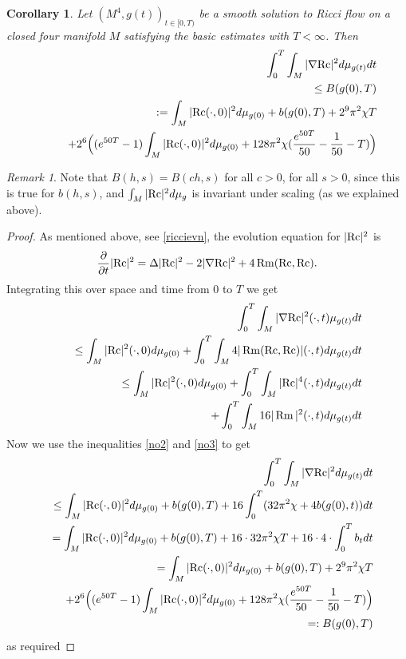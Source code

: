 \documentclass{amsart}
\numberwithin{equation}{section}
\newtheorem{coro}[theo]{Corollary}
\theoremstyle{definition}
\theoremstyle{remark}
\newtheorem{remark}[theo]{Remark}
\begin{document}
\begin{coro}\label{gradientestimate}
Let $(M^4,g(t))_{t \in [0,T)}$ be a  smooth solution to Ricci
flow on a closed four manifold $M$ satisfying the basic estimates with
$T< \infty$.
Then \begin{eqnarray}
 && \int_{0}^T \int_M |{\nabla} {{\rm{Rc}}}|^2 d \mu_{g(t)} dt \cr
&& \ \ \ \leq B(g(0),T)\cr
&& \ \ \ := 
\int_M |{{\rm{Rc}}}(\cdot,0)|^2  d \mu_{g(0)}  +b(g(0),T) +2^9
\pi^2\chi T \cr
&& \ \ \ \ \ + 2^6\Big( 
 (e^{50T}-1) \int_M |{{\rm{Rc}}}(\cdot,0)|^2  d
\mu_{g(0)}   + 128 \pi^2 \chi( \frac{e^{50T}}{50} - \frac{1}{50} - T)\Big)
\label{gradienteq}
\end{eqnarray}
\end{coro}
\begin{remark}
Note that $B(h,s) = B(ch,s)$ for all $c>0$, for all $s>0$, since this
is true for $b(h,s)$, and $\int_M |{{\rm{Rc}}}|^2 d\mu_g$ is invariant
under scaling (as we explained above).
\end{remark}
\begin{proof}
As mentioned above, see \eqref{riccievn},
the evolution equation for $|{{\rm{Rc}}}|^2$ is 
$${\frac{\partial }{\partial t} } |{{\rm{Rc}}}|^2 = {\Delta} |{{\rm{Rc}}}|^2 - 2 | {\nabla} {{\rm{Rc}}}|^2 + 4\operatorname{Rm}({{\rm{Rc}}},{{\rm{Rc}}}).$$
Integrating this over space  and time from $0$ to $T$  we get
\begin{eqnarray} 
&& \int_{0}^T \int_M |{\nabla} {{\rm{Rc}}}|^2( \cdot,t) \mu_{g(t)} dt \cr
&& \ \ \  \leq \int_M |{{\rm{Rc}}}|^2(\cdot,0)  d \mu_{g(0)}  + \int_0^T \int_M 4 |\operatorname{Rm}({{\rm{Rc}}},{{\rm{Rc}}}) |(\cdot,t)d \mu_{g(t)} dt \cr
&& \ \ \ \leq \int_M |{{\rm{Rc}}}|^2(\cdot,0) d \mu_{g(0)}  + \int_0^T \int_M |{{\rm{Rc}}}|^4(\cdot,t) d
\mu_{g(t)} dt  \cr
&& \ \ \ \ \
+ \int_0^T \int_M 16 |\operatorname{Rm}|^2(\cdot,t) d \mu_{g(t)} dt 
\end{eqnarray}
Now we use the  inequalities  \eqref{no2} and \eqref{no3} to get
\begin{eqnarray} 
&& \int_{0}^T \int_M |{\nabla} {{\rm{Rc}}}|^2 d \mu_{g(t)} dt \cr
&& \leq  \int_M |{{\rm{Rc}}}(\cdot,0)|^2  d \mu_{g(0)} + b(g(0),T) + 16 \int_0^T( 32
\pi^2 \chi +4 b(g(0),t)) dt\cr
&& = \int_M |{{\rm{Rc}}}(\cdot,0)|^2  d \mu_{g(0)}  +b(g(0),T) +16 \cdot 32
\pi^2\chi T + 16\cdot 4 \cdot \int_0^T b_t dt \cr
&& = \int_M |{{\rm{Rc}}}(\cdot,0)|^2  d \mu_{g(0)}  +b(g(0),T) +2^9
\pi^2\chi T \cr
&& \ \ + 2^6\Big( 
 (e^{50T}-1) \int_M |{{\rm{Rc}}}(\cdot,0)|^2  d
\mu_{g(0)}   + 128 \pi^2 \chi( \frac{e^{50T}}{50} - \frac{1}{50} - T)
\Big)\cr
&& =: B(g(0),T) 
\end{eqnarray}
as required
\end{proof}
\end{document}
